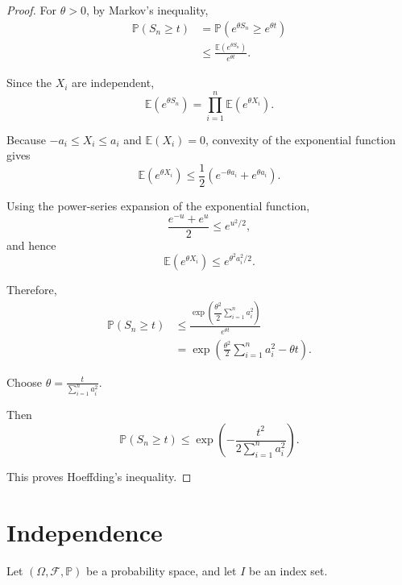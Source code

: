 \begin{proof}

For $\theta>0$, by Markov's inequality,
\[
\begin{aligned}
    \mathbb{P}(S_n\geq t)
    &=
    \mathbb{P}\left(e^{\theta S_n}\geq e^{\theta t}\right)\\
    &\leq
    \frac{\mathbb{E}\left(e^{\theta S_n}\right)}
    {e^{\theta t}}.
\end{aligned}
\]

Since the $X_i$ are independent,
\[
\mathbb{E}\left(e^{\theta S_n}\right)
=
\prod_{i=1}^{n}
\mathbb{E}\left(e^{\theta X_i}\right).
\]

Because
\(
    -a_i\leq X_i\leq a_i
\)
and $\mathbb{E}(X_i)=0$, convexity of the exponential function gives
\[
    \mathbb{E}\left(e^{\theta X_i}\right)
    \leq
    \frac{1}{2}
    \left(
        e^{-\theta a_i}
        +
        e^{\theta a_i}
    \right).
\]

Using the power-series expansion of the exponential function,
\[
    \frac{e^{-u}+e^u}{2}
    \leq
    e^{u^2/2},
\]
and hence
\[
    \mathbb{E}\left(e^{\theta X_i}\right)
    \leq
    e^{\theta^2a_i^2/2}.
\]

Therefore,
\[
\begin{aligned}
    \mathbb{P}(S_n\geq t)
    &\leq
    \frac{
        \exp\left(
            \dfrac{\theta^2}{2}
            \sum_{i=1}^{n}a_i^2
        \right)
    }
    {e^{\theta t}}\\
    &=
    \exp\left(
        \frac{\theta^2}{2}
        \sum_{i=1}^{n}a_i^2
        -
        \theta t
    \right).
\end{aligned}
\]

Choose
\(
    \theta
    =
    \frac{t}{\sum_{i=1}^{n}a_i^2}.
\)

Then
\[
    \mathbb{P}(S_n\geq t)
    \leq
    \exp\left(
        -\frac{t^2}
        {2\sum_{i=1}^{n}a_i^2}
    \right).
\]

This proves Hoeffding's inequality.

\end{proof}


\section{Independence}

Let
\(
    (\Omega,\mathcal{F},\mathbb{P})
\)
be a probability space, and let $I$ be an index set.

